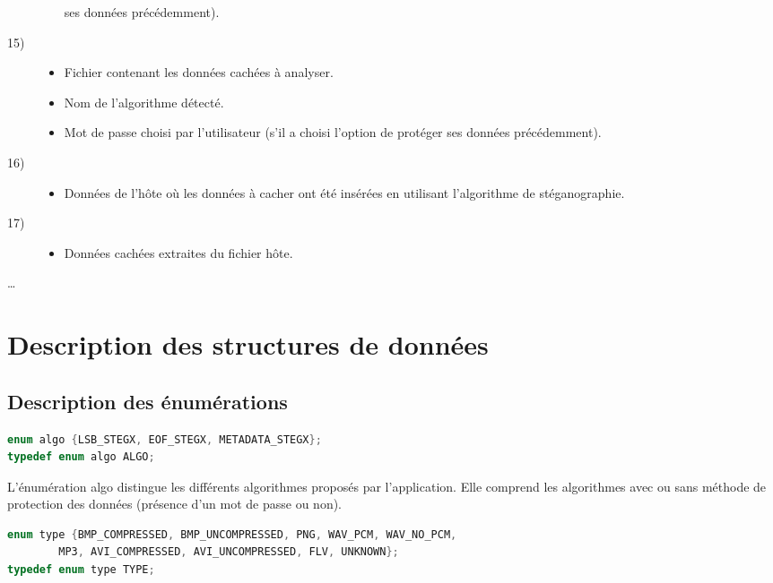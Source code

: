 \documentclass[11pt]{article}
\begin{document}
\begin{multicols}{2}
\begin{description}
\begin{itemize}
    ses données précédemment).
\end{itemize}
\item[15)]
\begin{itemize}
\item Fichier contenant les données cachées à analyser.
\item Nom de l'algorithme détecté.
\item Mot de passe choisi par l'utilisateur (s'il a choisi l'option de protéger
    ses données précédemment).
\end{itemize}
\item[16)]
\begin{itemize}
\item Données de l'hôte où les données à cacher ont été insérées en utilisant
    l'algorithme de stéganographie.
\end{itemize}
\item[17)]
\begin{itemize}
\item Données cachées extraites du fichier hôte.
\end{itemize}
\end{description}
  \ldots
\end{multicols}

\section{Description des structures de données}

\subsection{Description des énumérations}

\begin{lstlisting}[language=c]
enum algo {LSB_STEGX, EOF_STEGX, METADATA_STEGX};
typedef enum algo ALGO;
\end{lstlisting}

L'énumération algo distingue les différents algorithmes proposés par 
l'application. Elle comprend les algorithmes avec ou sans méthode de 
protection des données (présence d'un mot de passe ou non). 
\newline 

\begin{lstlisting}[language=c]
enum type {BMP_COMPRESSED, BMP_UNCOMPRESSED, PNG, WAV_PCM, WAV_NO_PCM, 
        MP3, AVI_COMPRESSED, AVI_UNCOMPRESSED, FLV, UNKNOWN};
typedef enum type TYPE;
\end{lstlisting}
\end{document}

